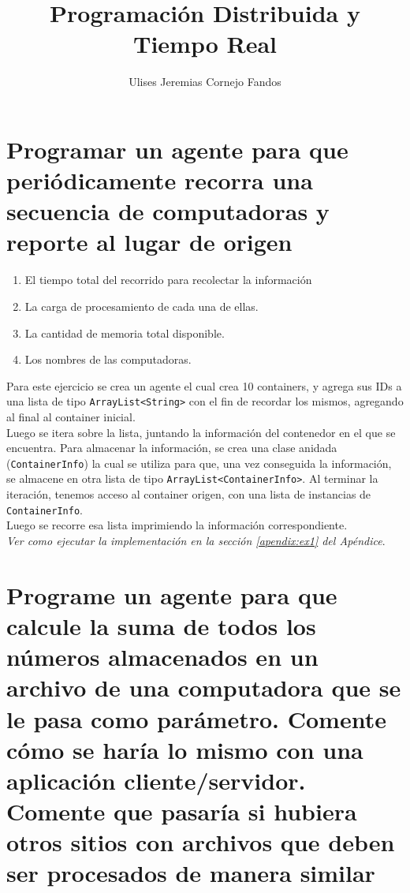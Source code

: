 \documentclass[osajnl,twocolumn,showpacs,superscriptaddress,10pt]{revtex4-1} %
\begin{document}
\title{Programación Distribuida y Tiempo Real}

\author{Ulises Jeremias Cornejo Fandos}

\maketitle %

\section{Programar un agente para que periódicamente recorra una secuencia de computadoras y reporte al lugar de origen}

\begin{enumerate}[label=\alph*)]
  \item El tiempo total del recorrido para recolectar la información
  \item La carga de procesamiento de cada una de ellas.
  \item La cantidad de memoria total disponible.
  \item Los nombres de las computadoras.
\end{enumerate}

Para este ejercicio se crea un agente el cual crea 10 containers, y agrega sus IDs a una lista de tipo \texttt{ArrayList<String>} con el fin de recordar los mismos,
agregando al final al container inicial. \\

Luego se itera sobre la lista, juntando la información
del contenedor en el que se encuentra. Para almacenar la información, se
crea una clase anidada (\texttt{ContainerInfo}) la cual se utiliza para que, una vez
conseguida la información, se almacene en otra lista de tipo \texttt{ArrayList<ContainerInfo>}.
Al terminar la iteración, tenemos acceso al container origen, con una lista de instancias de \texttt{ContainerInfo}. \\

Luego se recorre esa lista imprimiendo la información correspondiente. \\

\textit{Ver como ejecutar la implementación en la sección \ref{apendix:ex1} del Apéndice}.

\section{Programe un agente para que calcule la suma de todos los números
almacenados en un archivo de una computadora que se le pasa como
parámetro. Comente cómo se haría lo mismo con una aplicación
cliente/servidor. Comente que pasaría si hubiera otros sitios con
archivos que deben ser procesados de manera similar}
\end{document}
